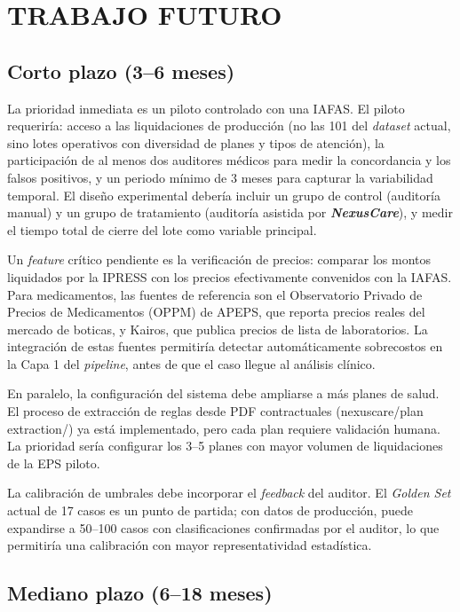 \chapter{TRABAJO FUTURO}

\section{Corto plazo (3–6 meses)}

La prioridad inmediata es un piloto controlado con una IAFAS. El piloto requeriría: acceso a las liquidaciones de producción (no las 101 del \textit{dataset}  actual, sino lotes operativos con diversidad de planes y tipos de atención), la participación de al menos dos auditores médicos para medir la concordancia y los falsos positivos, y un periodo mínimo de 3 meses para capturar la variabilidad temporal. El diseño experimental debería incluir un grupo de control (auditoría manual) y un grupo de tratamiento (auditoría asistida por \textbf{\textit{NexusCare}}), y medir el tiempo total de cierre del lote como variable principal.

Un \textit{feature} crítico pendiente es la verificación de precios: comparar los montos liquidados por la IPRESS con los precios efectivamente convenidos con la IAFAS. Para medicamentos, las fuentes de referencia son el Observatorio Privado de Precios de Medicamentos (OPPM) de APEPS, que reporta precios reales del mercado de boticas, y Kairos, que publica precios de lista de laboratorios. La integración de estas fuentes permitiría detectar automáticamente sobrecostos en la Capa 1 del \textit{pipeline}, antes de que el caso llegue al análisis clínico.

En paralelo, la configuración del sistema debe ampliarse a más planes de salud. El proceso de extracción de reglas desde PDF contractuales (nexuscare/plan extraction/) ya está implementado, pero cada plan requiere validación humana. La prioridad sería configurar los 3–5 planes con mayor volumen de liquidaciones de la EPS piloto.

La calibración de umbrales debe incorporar el \textit{feedback} del auditor. El \textit{Golden Set} actual de 17 casos es un punto de partida; con datos de producción, puede expandirse a 50–100 casos con clasificaciones confirmadas por el auditor, lo que permitiría una calibración con mayor representatividad estadística.

\section{Mediano plazo (6–18 meses)}

